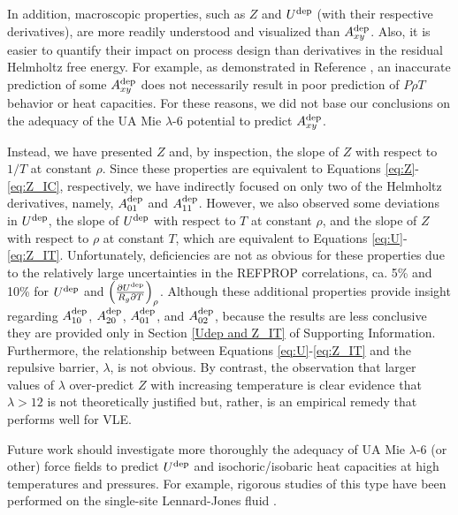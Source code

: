 \documentclass[preprint,letterpaper,floatfix,citeautoscript,aip,jcp]{revtex4-1}
\begin{document}
In addition, macroscopic properties, such as $Z$ and $U^{\rm dep}$ (with their respective derivatives), are more readily understood and visualized than $A_{xy}^{\rm dep}$. Also, it is easier to quantify their impact on process design than derivatives in the residual Helmholtz free energy. For example, as demonstrated in 
Reference , an inaccurate prediction of some $A_{xy}^{\rm dep}$ does not necessarily result in poor prediction of $P \rho T$ behavior or heat capacities. For these reasons, we did not base our conclusions on the adequacy of the UA Mie $\lambda$-6 potential to predict $A_{xy}^{\rm dep}$.

Instead, we have presented $Z$ and, by inspection, the slope of $Z$ with respect to $1/T$ at constant $\rho$. Since these properties are equivalent to Equations \ref{eq:Z}-\ref{eq:Z_IC}, respectively, we have indirectly focused on only two of the Helmholtz derivatives, namely, $A_{01}^{\rm dep}$ and $A_{11}^{\rm dep}$. However, we also observed some deviations in $U^{\rm dep}$, the slope of $U^{\rm dep}$ with respect to $T$ at constant $\rho$, and the slope of $Z$ with respect to $\rho$ at constant $T$, which are equivalent to Equations \ref{eq:U}-\ref{eq:Z_IT}. Unfortunately, deficiencies are not as obvious for these properties due to the relatively large uncertainties in the REFPROP correlations, ca. 5\% and 10\% for $U^{\rm dep}$ and $\left(\frac{\partial U^{\rm dep}}{R_g \partial T}\right)_\rho$. Although these additional properties provide insight regarding $A_{10}^{\rm dep}$, $A_{20}^{\rm dep}$, $A_{01}^{\rm dep}$, and $A_{02}^{\rm dep}$, because the results are less conclusive they are provided only in Section \ref{Udep and Z_IT} of Supporting Information. Furthermore, the relationship between Equations \ref{eq:U}-\ref{eq:Z_IT} and the repulsive barrier, $\lambda$, is not obvious. By contrast, the observation that larger values of $\lambda$ over-predict $Z$ with increasing temperature is clear evidence that $\lambda > 12$ is not theoretically justified but, rather, is an empirical remedy that performs well for VLE.

Future work should investigate more thoroughly the adequacy of UA Mie $\lambda$-6 (or other) force fields to predict $U^{\rm dep}$ and isochoric/isobaric heat capacities at high temperatures and pressures. For example, rigorous studies of this type have been performed on the single-site Lennard-Jones fluid \cite{Thol2016_LJ,Thol_LJTS,Rutkai2017}.  
\end{document}
